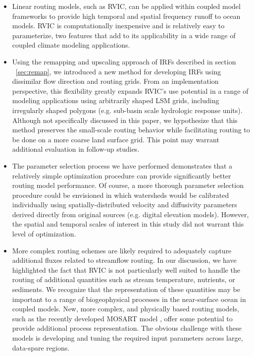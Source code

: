 \documentclass[jgrga, draft]{agutex}
\begin{document}
\begin{article}
\begin{itemize}[leftmargin=+.5in]
  \item Linear routing models, such as RVIC, can be applied within coupled model frameworks to provide high temporal and spatial frequency runoff to ocean models.
  RVIC is computationally inexpensive and is relatively easy to parameterize, two features that add to its applicability in a wide range of coupled climate modeling applications.
  \item Using the remapping and upscaling approach of IRFs described in section ~\ref{sec:remap}, we introduced a new method for developing IRFs using dissimilar flow direction and routing grids.
  From an implementation perspective, this flexibility greatly expands RVIC's use potential in a range of modeling applications using arbitrarily shaped LSM grids, including irregularly shaped polygons (e.g. sub-basin scale hydrologic response units).
  Although not specifically discussed in this paper, we hypothesize that this method preserves the small-scale routing behavior while facilitating routing to be done on a more coarse land surface grid.
  This point may warrant additional evaluation in follow-up studies.
  \item The parameter selection process we have performed demonstrates that a relatively simple optimization procedure can provide significantly better routing model performance.
  Of course, a more thorough parameter selection procedure could be envisioned in which watersheds would be calibrated individually using spatially-distributed velocity and diffusivity parameters derived directly from original sources (e.g. digital elevation models).
  However, the spatial and temporal scales of interest in this study did not warrant this level of optimization.
  \item More complex routing schemes are likely required to adequately capture additional fluxes related to streamflow routing.
  In our discussion, we have highlighted the fact that RVIC is not particularly well suited to handle the routing of additional quantities such as stream temperature, nutrients, or sediments.
  We recognize that the representation of these quantities may be important to a range of biogeophysical processes in the near-surface ocean in coupled models.
  New, more complex, and physically based routing models, such as the recently developed MOSART model \citep{Li_2013}, offer some potential to provide additional process representation.
  The obvious challenge with these models is developing and tuning the required input parameters across large, data-spare regions.

\end{itemize}
\end{article}
\end{document}
